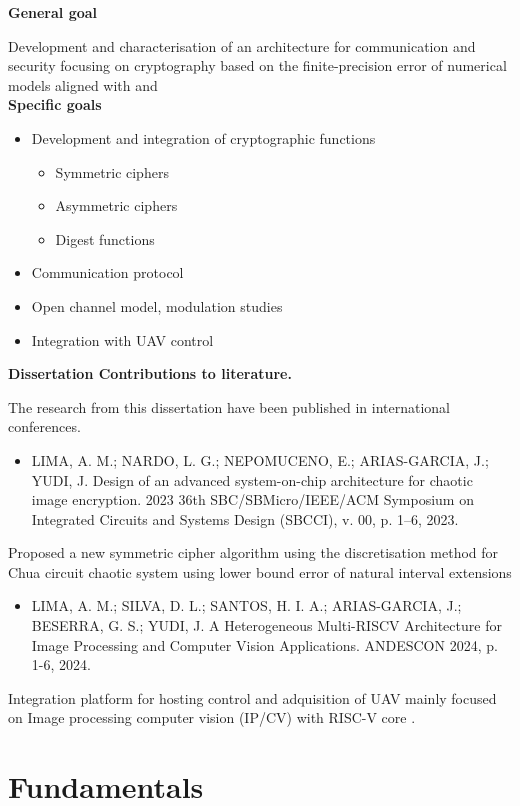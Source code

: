 \noindent\textbf{General goal}

Development and characterisation of an architecture for communication and security focusing on cryptography based on the finite-precision error of numerical models aligned with \cite{RTCA_DO362} and \cite{RTCA_DO365}\\

\noindent\textbf{Specific goals}
\begin{itemize}
    \item Development and integration of cryptographic functions
    \begin{itemize}
        \item Symmetric ciphers
        \item Asymmetric ciphers
        \item Digest functions
    \end{itemize}
    \item Communication protocol
    \item Open channel model, modulation studies
    \item Integration with UAV control
\end{itemize}
\noindent \textbf{Dissertation Contributions to literature.}

\noindent The research from this dissertation have been published in international conferences.
\begin{itemize}
    \item LIMA, A. M.; NARDO, L. G.; NEPOMUCENO, E.; ARIAS-GARCIA, J.; YUDI, J. Design of an advanced system-on-chip architecture for chaotic image encryption. 2023 36th SBC/SBMicro/IEEE/ACM Symposium on Integrated Circuits and Systems Design (SBCCI), v. 00, p. 1–6, 2023.
\end{itemize}
Proposed a new symmetric cipher algorithm using the discretisation method for Chua circuit chaotic system using lower bound error of natural interval extensions\\
\begin{itemize}
    \item LIMA, A. M.; SILVA, D. L.; SANTOS, H. I. A.; ARIAS-GARCIA, J.; BESERRA, G. S.; YUDI, J. A Heterogeneous Multi-RISCV Architecture for Image Processing and Computer Vision Applications. ANDESCON 2024, p. 1-6, 2024.
\end{itemize}
Integration platform for hosting control and adquisition of UAV mainly focused on Image processing computer vision (IP/CV) with RISC-V core \cite{picorv32}.

\chapter{Fundamentals}
